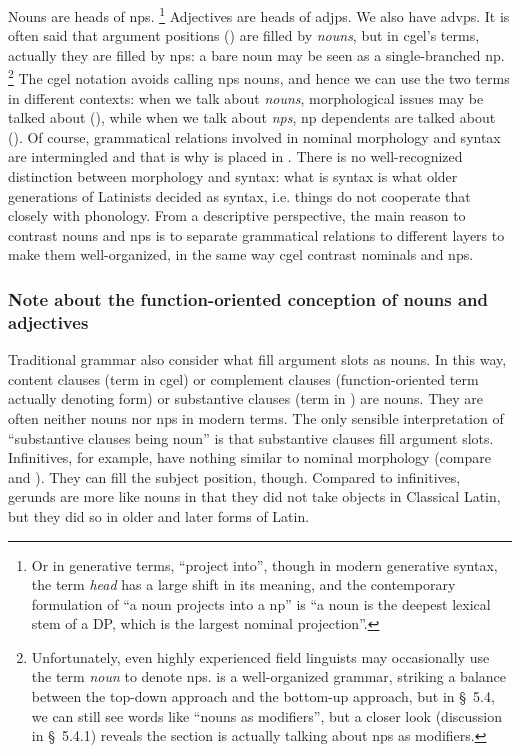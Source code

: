 \documentclass{article}
\newcommand*{\citesec}[1]{\S~{#1}}
\newcommand*{\term}[1]{\emph{#1}}
\begin{document}
Nouns are heads of \ac{np}s.%
\footnote{
    Or in generative terms, ``project into'', though in modern generative syntax,
    the term \term{head} has a large shift in its meaning,
    and the contemporary formulation of ``a noun projects into a \ac{np}''
    is ``a noun is the deepest lexical stem of a DP, 
    which is the largest nominal projection''.
}
Adjectives are heads of \ac{adjp}s. We also have \ac{advp}s.
It is often said that argument positions () are filled by \emph{nouns},
but in \ac{cgel}'s terms, actually they are filled by \ac{np}s:
a bare noun may be seen as a single-branched \ac{np}.%
\footnote{
    Unfortunately, even highly experienced field linguists 
    may occasionally use the term \term{noun} to denote \ac{np}s.
    \citet{friesen2017grammar} is a well-organized grammar,
    striking a balance between the top-down approach and the bottom-up approach,
    but in \citesec{5.4},
    we can still see words like ``nouns as modifiers'',
    but a closer look (discussion in \citesec{5.4.1}) reveals the section is actually talking about 
    \ac{np}s as modifiers.
}
The \ac{cgel} notation avoids calling \ac{np}s nouns, 
and hence we can use the two terms in different contexts:
when we talk about \term{nouns},
morphological issues may be talked about (),
while when we talk about \term{\ac{np}s},
\ac{np} dependents are talked about ().
Of course, grammatical relations involved in nominal morphology and syntax are intermingled
and that is why  is placed in .
There is no well-recognized distinction between morphology and syntax:
what is syntax is what older generations of Latinists decided as syntax,
i.e. things do not cooperate that closely with phonology.
From a descriptive perspective, 
the main reason to contrast nouns and \ac{np}s 
is to separate grammatical relations to different layers
to make them well-organized,
in the same way \ac{cgel} contrast nominals and \ac{np}s.

\subsubsection{Note about the function-oriented conception of nouns and adjectives}

Traditional grammar also consider what fill argument slots as nouns.
In this way, content clauses (term in \ac{cgel}) 
or complement clauses (function-oriented term actually denoting form) 
or substantive clauses (term in \citet{allen1903allen})
are nouns.
They are often neither nouns nor \ac{np}s in modern terms.
The only sensible interpretation of ``substantive clauses being noun''
is that substantive clauses fill argument slots.
Infinitives, for example, have nothing similar to nominal morphology 
(compare  and ).
They can fill the subject position, though.
Compared to infinitives, 
gerunds are more like nouns in that they did not take objects in Classical Latin,
but they did so in older and later forms of Latin.
\end{document}
